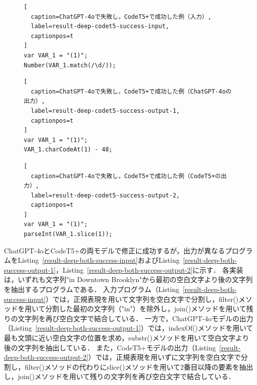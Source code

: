 \documentclass[11pt]{jreport}
\begin{document}
\begin{figure}[t]
\captionsetup{name=Listing}
\hspace{0.04\columnwidth}
\begin{minipage}[b]{0.96\linewidth}
\begin{lstlisting}[
  caption=ChatGPT-4oで失敗し，CodeT5+で成功した例（入力）,
  label=result-deep-codet5-success-input,
  captionpos=t
]
var VAR_1 = "(1)";
Number(VAR_1.match(/\d/));
\end{lstlisting}
\end{minipage}

\hspace{0.04\columnwidth}
\begin{minipage}[b]{0.96\linewidth}
\begin{lstlisting}[
  caption=ChatGPT-4oで失敗し，CodeT5+で成功した例（ChatGPT-4oの出力）,
  label=result-deep-codet5-success-output-1,
  captionpos=t
]
var VAR_1 = "(1)";
VAR_1.charCodeAt(1) - 48;
\end{lstlisting}
\end{minipage}

\hspace{0.04\columnwidth}
\begin{minipage}[b]{0.96\linewidth}
\begin{lstlisting}[
  caption=ChatGPT-4oで失敗し，CodeT5+で成功した例（CodeT5+の出力）,
  label=result-deep-codet5-success-output-2,
  captionpos=t
]
var VAR_1 = "(1)";
parseInt(VAR_1.slice(1));
\end{lstlisting}
\end{minipage}
\end{figure}


ChatGPT-4oとCodeT5+の両モデルで修正に成功するが，出力が異なるプログラムをListing~\ref{result-deep-both-success-input}およびListing~\ref{result-deep-both-success-output-1}，Listing~\ref{result-deep-both-success-output-2}に示す．
各実装は，いずれも文字列"in Downtown Brooklyn"から最初の空白文字より後の文字列を抽出するプログラムである．
入力プログラム（Listing~\ref{result-deep-both-success-input}）では，正規表現を用いて文字列を空白文字で分割し，filter()メソッドを用いて分割した最初の文字列（"in"）を除外し，join()メソッドを用いて残りの文字列を再び空白文字で結合している．
一方で，ChatGPT-4oモデルの出力（Listing~\ref{result-deep-both-success-output-1}）では，indexOf()メソッドを用いて最も文頭に近い空白文字の位置を求め，substr()メソッドを用いて空白文字より後の文字列を抽出している．
また，CodeT5+モデルの出力（Listing~\ref{result-deep-both-success-output-2}）では，正規表現を用いずに文字列を空白文字で分割し，filter()メソッドの代わりにslice()メソッドを用いて2番目以降の要素を抽出し，join()メソッドを用いて残りの文字列を再び空白文字で結合している．
\end{document}
